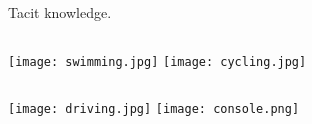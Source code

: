 \begin{frame}{Tacit knowledge.}
    \pause
    \begin{columns}
            \center\texttt{[image: swimming.jpg]}
            \pause
            \center\texttt{[image: cycling.jpg]}
            \pause
    \end{columns}
    \begin{columns}
            \center\texttt{[image: driving.jpg]}
            \pause
            \center\texttt{[image: console.png]}
    \end{columns}
\end{frame}
